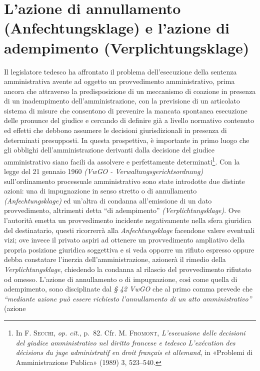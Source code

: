 \documentclass[12pt,it,a4paper,]{report}
\begin{document}
\hypertarget{lazione-di-annullamento-anfechtungsklage-e-lazione-di-adempimento-verplichtungsklage}{%
\section{L'azione di annullamento (Anfechtungsklage) e l'azione di
adempimento
(Verplichtungsklage)}\label{lazione-di-annullamento-anfechtungsklage-e-lazione-di-adempimento-verplichtungsklage}}

Il legislatore tedesco ha affrontato il problema dell'esecuzione della
sentenza amministrativa avente ad oggetto un provvedimento
amministrativo, prima ancora che attraverso la predisposizione di un
meccanismo di coazione in presenza di un inadempimento
dell'amministrazione, con la previsione di un articolato sistema di
misure che consentono di prevenire la mancata spontanea esecuzione delle
pronunce del giudice e cercando di definire già a livello normativo
contenuto ed effetti che debbono assumere le decisioni giurisdizionali
in presenza di determinati presupposti. In questa prospettiva, è
importante in primo luogo che gli obblighi dell'amministrazione
derivanti dalla decisione del giudice amministrativo siano facili da
assolvere e perfettamente determinati\footnote{In \textsc{F. Secchi},
  \emph{op. cit.}, p.~82. Cfr. M. \textsc{Fromont}, \emph{L'esecuzione
  delle decisioni del giudice amministrativo nel diritto francese e
  tedesco L'exécution des décisions du juge administratif en droit
  français et allemand}, in {«Problemi di Amministrazione Publica»}
  (1989) 3, 523--540.}. Con la legge del 21 gennaio 1960 \emph{(VwGO -
Verwaltungsgerichtsordnung)} sull'ordinamento processuale amministrativo
sono state introdotte due distinte azioni: una di impugnazione in senso
stretto o di annullamento \emph{(Anfechtungsklage)} ed un'altra di
condanna all'emissione di un dato provvedimento, altrimenti detta ``di
adempimento'' \emph{(Verplichtungsklage)}. Ove l'autorità emetta un
provvedimento incidente negativamente nella sfera giuridica del
destinatario, questi ricorrerrà alla \emph{Anfechtungsklage} facendone
valere eventuali vizi; ove invece il privato aspiri ad ottenere un
provvedimento ampliativo della propria posizione giuridica soggettiva e
si veda opporre un rifiuto espresso oppure debba constatare l'inerzia
dell'amministrazione, azionerà il rimedio della
\emph{Verplichtungsklage}, chiedendo la condanna al rilascio del
provvedimento rifiutato od omesso. L'azione di annullamento o di
impugnazione, così come quella di adempimento, sono disciplinate dal
\emph{§ 42 VwGO} che al primo comma prevede che \emph{``mediante azione
può essere richiesto l'annullamento di un atto amministrativo''} (azione
\end{document}
